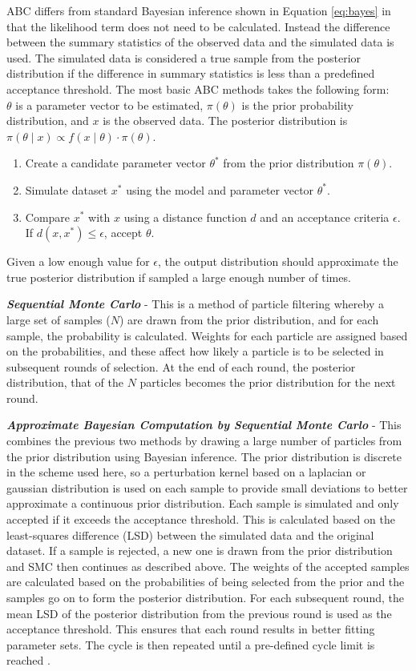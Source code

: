 ABC differs from standard Bayesian inference shown in Equation \ref{eq:bayes} in that the likelihood term does not need to be calculated. Instead the difference between the summary statistics of the observed data and the simulated data is used. The simulated data is considered a true sample from the posterior distribution if the difference in summary statistics is less than a predefined acceptance threshold.
The most basic ABC methods takes the following form:\\
$\theta$ is a parameter vector to be estimated, $\pi(\theta)$ is the prior probability distribution, and $x$ is the observed data. The posterior distribution is $\pi(\theta \mid x) \propto f(x \mid \theta)\cdot \pi(\theta)$.
\begin{enumerate}
	\item Create a candidate parameter vector $\theta^*$ from the prior distribution $\pi(\theta)$.
	\item Simulate dataset $x^*$ using the model and parameter vector $\theta^*$.
	\item Compare $x^*$ with $x$ using a distance function $d$ and an acceptance criteria $\epsilon$. If $d(x,x^*)\leq \epsilon$, accept $\theta$.
\end{enumerate}

Given a low enough value for $\epsilon$, the output distribution should approximate the true posterior distribution if sampled a large enough number of times.

\textbf{\textit{Sequential Monte Carlo}} - This is a method of particle filtering whereby a large set of samples ($N$) are drawn from the prior distribution, and for each sample, the probability is calculated. Weights for each particle are assigned based on the probabilities, and these affect how likely a particle is to be selected in subsequent rounds of selection. At the end of each round, the posterior distribution, that of the $N$ particles becomes the prior distribution for the next round.

\textbf{\textit{Approximate Bayesian Computation by Sequential Monte Carlo}} - This combines the previous two methods by drawing a large number of particles from the prior distribution using Bayesian inference. The prior distribution is discrete in the scheme used here, so a perturbation kernel based on a laplacian or gaussian distribution is used on each sample to provide small deviations to better approximate a continuous prior distribution. Each sample is simulated and only accepted if it exceeds the acceptance threshold. This is calculated based on the least-squares difference (LSD) between the simulated data and the original dataset. If a sample is rejected, a new one is drawn from the prior distribution and SMC then continues as described above. The weights of the accepted samples are calculated based on the probabilities of being selected from the prior and the samples go on to form the posterior distribution. For each subsequent round, the mean LSD of the posterior distribution from the previous round is used as the acceptance threshold. This ensures that each round results in better fitting parameter sets. The cycle is then repeated until a pre-defined cycle limit is reached \cite{Toni2009}.

